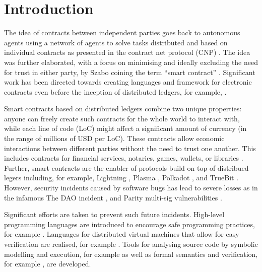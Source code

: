 \section{Introduction}
The idea of contracts between independent parties goes back to autonomous agents using a network of agents to solve tasks distributed and based on individual contracts as presented in the contract net protocol (CNP) \cite{Smith1980}.
The idea was further elaborated, with a focus on minimising and ideally excluding the need for trust in either party, by Szabo coining the term ``smart contract'' \cite{Szabo1997}.
Significant work has been directed towards creating languages and framework for electronic contracts even before the inception of distributed ledgers, for example, \cite{Andersen2006,Kyas2008,Xu2004}.


Smart contracts based on distributed ledgers combine two unique properties: anyone can freely create such contracts for the whole world to interact with, while each line of code (LoC) might affect a significant amount of currency (in the range of millions of USD per LoC).
These contracts allow economic interactions between different parties without the need to trust one another.
This includes contracts for financial services, notaries, games, wallets, or libraries \cite{Bartoletti2017}.
Further, smart contracts are the enabler of protocols build on top of distribued legers including, for example, Lightning \cite{Poon2016}, Plasma \cite{Poon2017}, Polkadot \cite{Wood2017}, and TrueBit \cite{Teutsch2017}.
However, security incidents caused by software bugs has lead to severe losses as in the infamous The DAO incident \cite{Daian2016}, and Parity multi-sig vulnerabilities \cite{Breidenbach2017Parity,ParityTech2017}. 


Significant efforts are taken to prevent such future incidents. 
High-level programming languages are introduced to encourage safe programming practices, for example  \cite{Hirai2018Bamboo,Ethereum2018Vyper,Schrans2018}.
Languages for distributed virtual machines that allow for easy verification are realised, for example \cite{Sergey2018,DynamicLedgerSolutions2017,Popejoy2017,Kasampalis2018}.
Tools for analysing source code by symbolic modelling and execution, for example \cite{Luu2016,Tsankov2017,Kalra2018,Albert2018} as well as formal semantics and verification, for example \cite{Bhargavan2016,Hildenbrandt2017,Hirai2017}, are developed.

